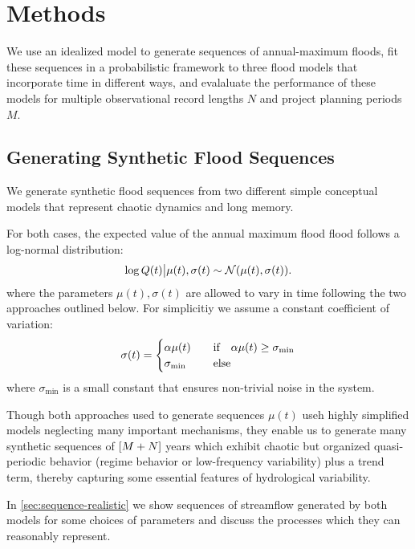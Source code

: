 \documentclass[12pt]{article}
\begin{document}
\section{Methods}\label{sec:methods}

We use an idealized model to generate sequences of annual-maximum floods, fit these sequences in a probabilistic framework to three flood models that incorporate time in different ways, and evalaluate the performance of these models for multiple observational record lengths \(N\) and project planning periods \(M\).

\subsection{Generating Synthetic Flood Sequences}

We generate synthetic flood sequences from two different simple conceptual models that represent chaotic dynamics and long memory.

For both cases, the expected value of the annual maximum flood flood follows a log-normal distribution:
\begin{equation} \label{eq:lognormal}
  \log Q(t) \big| \mu(t),\sigma(t) \sim \mathcal{N} \qty(\mu(t), \sigma(t)).
\end{equation}
where the parameters \( \mu(t), \sigma(t) \) are allowed to vary in time following the two approaches outlined below.
For simplicitiy we assume a constant coefficient of variation:
\begin{equation}
  \sigma(t) = \begin{cases} \alpha \mu(t) & \qqtext{if} \alpha \mu(t) \geq \sigma_\text{min} \\ \sigma_\text{min} & \qqtext{else} \end{cases}
\end{equation}
where \(\sigma_\text{min}\) is a small constant that ensures non-trivial noise in the system.

Though both approaches used to generate sequences \( \mu(t) \) useh highly simplified models neglecting many important mechanisms, they enable us to generate many synthetic sequences of \(\qty[M + N]\) years which exhibit chaotic but organized quasi-periodic behavior (regime behavior or low-frequency variability) plus a trend term, thereby capturing some essential features of hydrological variability.

In \cref{sec:sequence-realistic} we show sequences of streamflow generated by both models for some choices of parameters and discuss the processes which they can reasonably represent.
\end{document}
